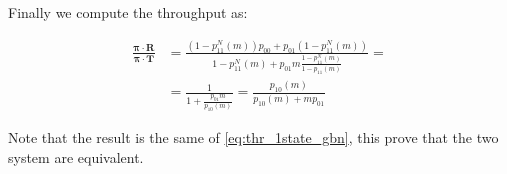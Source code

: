 Finally we compute the throughput as:

\begin{equation}
	\begin{split}
	\frac{\mathbf{\pi}\cdot\mathbf{R}}{\mathbf{\pi}\cdot\mathbf{T}} &=
	\frac{(1-p_{11}^N(m))p_{00} + p_{01}(1-p_{11}^N(m))}{1-p_{11}^N(m) + p_{01}m\frac{1-p_{11}^N(m)}{1-p_{11}(m)}} = \\
	&= \frac{1}{1+ \frac{p_{01}m}{p_{10}(m)}} = \frac{p_{10}(m)}{p_{10}(m) + mp_{01}}
	\end{split}
\end{equation}

Note that the result is the same of \autoref{eq:thr_1state_gbn}, this prove that the two system are equivalent.

